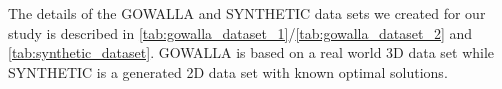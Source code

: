 The details of the GOWALLA and SYNTHETIC data sets we created for our study is described in \cref{tab:gowalla_dataset_1}/\cref{tab:gowalla_dataset_2} and \cref{tab:synthetic_dataset}. GOWALLA is based on a real world 3D data set while SYNTHETIC is a generated 2D data set with known optimal solutions.

%
\begin{minipage}{0.5\textwidth}
    
\end{minipage}
\begin{minipage}{0.5\textwidth}
    
\end{minipage}



